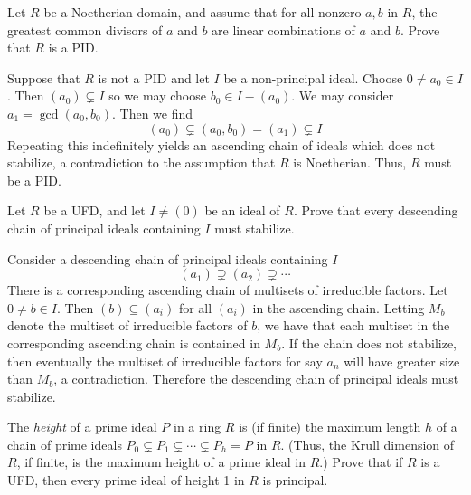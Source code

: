 \documentclass[../../master.tex]{subfiles}
\begin{document}
    \begin{problem}
        Let $R$ be a Noetherian domain, and assume that for all nonzero $a, b$
        in $R$, the greatest common divisors of $a$ and $b$ are linear
        combinations of $a$ and $b$. Prove that $R$ is a PID.
    \end{problem}

    \begin{solution}
        Suppose that $R$ is not a PID and let $I$ be a non-principal ideal.
        Choose $0 \neq a_0 \in I$. Then $(a_0) \subsetneq I$ so we may choose
        $b_0 \in I - (a_0)$. We may consider $a_1 = \gcd(a_0, b_0)$. Then we
        find
        \[
            (a_0) \subsetneq (a_0, b_0) = (a_1) \subsetneq I
        \] 
        Repeating this indefinitely yields an ascending chain of ideals which
        does not stabilize, a contradiction to the assumption that $R$ is
        Noetherian. Thus, $R$ must be a PID.
    \end{solution}

    \begin{problem}
        Let $R$ be a UFD, and let $I \neq (0)$ be an ideal of $R$. Prove that
        every descending chain of principal ideals containing $I$ must
        stabilize.
    \end{problem}

    \begin{solution}
        Consider a descending chain of principal ideals
        containing $I$ 
        \[
            (a_1) \supsetneq (a_2) \supsetneq \cdots
        \] 
        There is a corresponding ascending chain of multisets of irreducible
        factors. Let $0 \neq b \in I$. Then $(b) \subseteq (a_i)$ for all
        $(a_i)$ in the ascending chain. Letting $M_b$ denote the multiset of
        irreducible factors of $b$, we have that each multiset in the
        corresponding ascending chain is contained in $M_b$. If the chain does
        not stabilize, then eventually the multiset of irreducible factors for
        say $a_n$ will have greater size than $M_b$,  a contradiction. Therefore the
        descending chain of principal ideals must stabilize.
    \end{solution}

    \begin{problem}
        The \textit{height} of a prime ideal $P$ in a ring $R$ is (if finite)
        the maximum length $h$ of a chain of prime ideals $P_0 \subsetneq P_1
        \subsetneq \cdots \subsetneq P_h = P$ in $R$. (Thus, the Krull dimension
        of $R$, if finite, is the maximum height of a prime ideal in $R$.) Prove
        that if $R$ is a UFD, then every prime ideal of height 1 in $R$ is
        principal.
    \end{problem}
\end{document}
